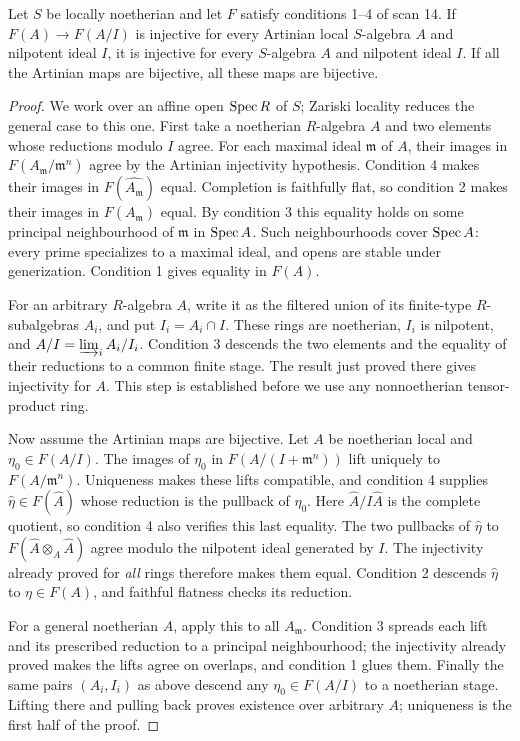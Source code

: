 \begin{lemma}\label{A:artinian-tests}
Let $S$ be locally noetherian and let $F$ satisfy conditions 1--4 of
scan 14. If $F(A)\to F(A/I)$ is injective for every Artinian local
$S$-algebra $A$ and nilpotent ideal $I$, it is injective for every
$S$-algebra $A$ and nilpotent ideal $I$. If all the Artinian maps are
bijective, all these maps are bijective.
\end{lemma}
\begin{proof}
We work over an affine open $\operatorname{Spec} R$ of $S$; Zariski locality reduces
the general case to this one. First take a noetherian $R$-algebra $A$
and two elements whose reductions modulo $I$ agree. For each maximal
ideal $\mathfrak m$ of $A$, their images in
$F(A_{\mathfrak m}/\mathfrak m^n)$ agree by the Artinian injectivity
hypothesis. Condition 4 makes their images in
$F(\widehat{A_{\mathfrak m}})$ equal. Completion is faithfully flat,
so condition 2 makes their images in $F(A_{\mathfrak m})$ equal.
By condition 3 this equality holds on some principal neighbourhood of
$\mathfrak m$ in $\operatorname{Spec} A$. Such neighbourhoods cover $\operatorname{Spec} A$:
every prime specializes to a maximal ideal, and opens are stable under
generization. Condition 1 gives equality in $F(A)$.

For an arbitrary $R$-algebra $A$, write it as the filtered union of
its finite-type $R$-subalgebras $A_i$, and put $I_i=A_i\cap I$.
These rings are noetherian, $I_i$ is nilpotent, and
$A/I=\varinjlim_i A_i/I_i$. Condition 3 descends the two elements and
the equality of their reductions to a common finite stage. The result
just proved there gives injectivity for $A$. This step is established
before we use any nonnoetherian tensor-product ring.

Now assume the Artinian maps are bijective. Let $A$ be noetherian local
and $\eta_0\in F(A/I)$. The images of $\eta_0$ in
$F(A/(I+\mathfrak m^n))$ lift uniquely to $F(A/\mathfrak m^n)$.
Uniqueness makes these lifts compatible, and condition 4 supplies
$\widehat\eta\in F(\widehat A)$ whose reduction is the pullback of
$\eta_0$. Here $\widehat A/I\widehat A$ is the complete quotient,
so condition 4 also verifies this last equality. The two pullbacks of
$\widehat\eta$ to $F(\widehat A\otimes_A\widehat A)$ agree modulo
the nilpotent ideal generated by $I$. The injectivity already proved
for \emph{all} rings therefore makes them equal. Condition 2 descends
$\widehat\eta$ to $\eta\in F(A)$, and faithful flatness checks its
reduction.

For a general noetherian $A$, apply this to all $A_{\mathfrak m}$.
Condition 3 spreads each lift and its prescribed reduction to a
principal neighbourhood; the injectivity already proved makes the
lifts agree on overlaps, and condition 1 glues them. Finally the
same pairs $(A_i,I_i)$ as above descend any $\eta_0\in F(A/I)$ to
a noetherian stage. Lifting there and pulling back proves existence
over arbitrary $A$; uniqueness is the first half of the proof.
\end{proof}

